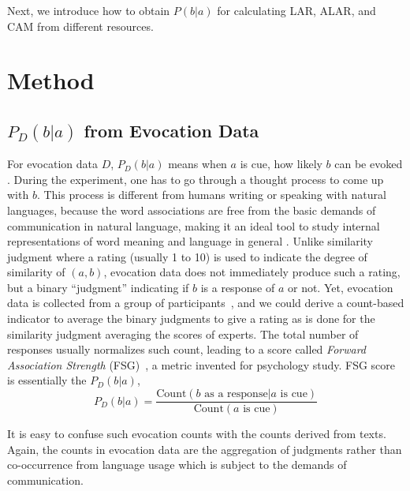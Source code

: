 \documentclass[letterpaper]{article} %
\begin{document}
Next, we introduce how to obtain $P(b|a)$ for calculating LAR, ALAR, and CAM from different resources. 

\section{Method} \label{sec:pba}

\subsection{$P_D(b|a)$ from Evocation Data}
For evocation data $D$, $P_D(b|a)$ means when $a$ is cue, how likely $b$ can be evoked \cite{kiss1973associative}. During the experiment, one has to go through a thought process to come up with $b$. This process is different from  humans writing or speaking with natural languages, because the word associations are free from the basic demands of communication in natural language, making it an ideal tool to study internal representations of word meaning and language in general \cite{de2019small}. Unlike similarity judgment where a rating (usually 1 to 10) is used to indicate the degree of similarity of $(a,b)$, evocation data does not immediately produce such a rating, but a binary ``judgment'' indicating if $b$ is a response of $a$ or not. Yet, evocation data is collected from a group of participants~\citep{de2019small,nelson2004university}, and we could derive a count-based indicator to average the binary judgments to give a rating as is done for the similarity judgment averaging the scores of experts. The total number of responses usually normalizes such count, leading to a score called \textit{Forward Association Strength} (FSG)~\citep{nelson2004university}, a metric invented for psychology study. FSG score is essentially the $P_D(b|a)$,
\begin{equation}
    P_D(b|a) = \frac{ \text{Count}(b \mbox{ as a response} | a \mbox{ is cue}) } { \text{Count} (a \mbox{ is cue})}
\end{equation}

It is easy to confuse such evocation counts with the counts derived from texts. Again, the counts in evocation data are the aggregation of judgments \cite{de2019small} rather than co-occurrence from language usage which is subject to the demands of communication.
\end{document}
